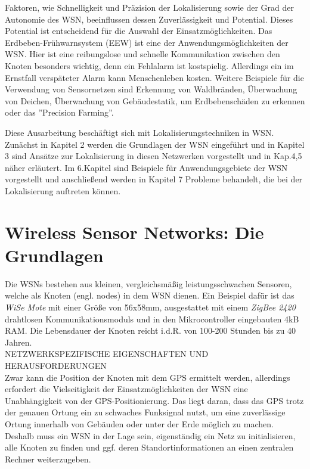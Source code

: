\documentclass[12pt, a4wide]{scrreprt}
\begin{document}
Faktoren, wie Schnelligkeit und Präzision der Lokalisierung sowie der Grad der Autonomie des WSN, beeinflussen dessen Zuverlässigkeit und Potential. Dieses Potential ist entscheidend für die Auswahl der Einsatzmöglichkeiten. Das Erdbeben-Frühwarnsystem (EEW) ist eine der Anwendungsmöglichkeiten der \ac{WSN}. Hier ist eine reibungslose und schnelle Kommunikation zwischen den Knoten besonders wichtig, denn ein Fehlalarm ist kostspielig. Allerdings ein im Ernstfall verspäteter Alarm kann Menschenleben kosten. Weitere Beispiele für die Verwendung von Sensornetzen sind Erkennung von Waldbränden, Überwachung von Deichen, Überwachung von Gebäudestatik, um Erdbebenschäden zu erkennen\cite{building_monitoring} oder das ''Precision Farming''.

Diese Ausarbeitung beschäftigt sich mit Lokalisierungstechniken in \acs{WSN}. Zunächst in Kapitel 2 werden die Grundlagen der \acs{WSN} eingeführt und in Kapitel 3 sind Ansätze zur Lokalisierung in diesen Netzwerken vorgestellt und in Kap.4,5 näher erläutert. Im 6.Kapitel sind Beispiele für Anwendungsgebiete der \acs{WSN} vorgestellt und anschließend werden in Kapitel 7 Probleme behandelt, die bei der Lokalisierung auftreten können.


\chapter{Wireless Sensor Networks: Die Grundlagen}
Die WSNs bestehen aus kleinen, vergleichsmäßig leistungsschwachen Sensoren, welche als Knoten (engl. nodes) in dem WSN dienen. Ein Beispiel dafür ist das \textit{WiSe Mote} mit einer Größe von 56x58mm, ausgestattet mit einem \textit{ZigBee 2420} drahtlosen Kommunikationsmoduls und in den Mikrocontroller eingebauten 4kB RAM\cite{WiSe}. Die Lebensdauer der Knoten reicht i.d.R. von 100-200 Stunden\cite{lifetime_study} bis zu 40 Jahren\cite{lisocl}.\\

NETZWERKSPEZIFISCHE EIGENSCHAFTEN UND HERAUSFORDERUNGEN\\

Zwar kann die Position der Knoten mit dem GPS ermittelt werden, allerdings erfordert die Vielseitigkeit der Einsatzmöglichkeiten der WSN eine Unabhängigkeit von der GPS-Positionierung. Das liegt daran, dass das GPS trotz der genauen Ortung ein zu schwaches Funksignal nutzt, um eine zuverlässige  Ortung innerhalb von Gebäuden oder unter der Erde möglich zu machen. Deshalb muss ein WSN in der Lage sein, eigenständig ein Netz zu initialisieren, alle Knoten zu finden und ggf. deren Standortinformationen an einen zentralen Rechner weiterzugeben.
\end{document}
